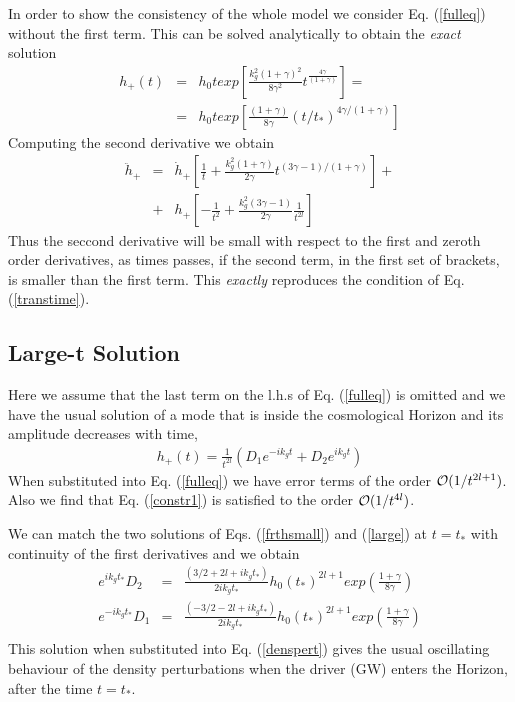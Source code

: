 \documentclass[prd,twocolumn,showpacs,preprintnumbers,amsmath,amssy mb]{revtex4}
\newcommand{\bea}{\begin{eqnarray}}
\newcommand{\eea}{\end{eqnarray}}
\newcommand{\nn}{\nonumber}
\begin{document}
In order to show the consistency of the whole model we consider 
Eq. (\ref{fulleq}) without the first term. This can be solved analytically 
to obtain the {\it exact} solution 
\bea 
\label{frthsmall}
h_{+}(t)&=&h_{0}texp
\left[\frac{k_{g}^{2}(1+\gamma )^{2}}{8\gamma ^{2}}t^{\frac{4\gamma }{(1+\gamma )}}\right]
=\nn \\&=&h_{0}texp
\left[\frac{(1+\gamma )}{8\gamma }(t/t_{*})^{4\gamma /(1+\gamma )}\right]
\eea
Computing the second derivative we obtain 
\bea 
\label{doublder}
\ddot{h}_{+}&=&\dot{h}_{+}
\left[\frac{1}{t}+\frac{k_{g}^{2}(1+\gamma )}{2\gamma }t^{(3\gamma -1)/(1+\gamma )}\right]
+\nn \\&+&h_{+}
\left[-\frac{1}{t^{2}}+\frac{k_{g}^{2}(3\gamma -1)}{2\gamma }\frac{1}{t^{2l}}\right]
\eea
Thus the seccond derivative will be small with respect to the first 
and zeroth order derivatives, as times passes, if the second term, in the 
first set of brackets, is smaller than the first term. This {\it exactly} 
reproduces the condition of Eq. (\ref{transtime}).



\subsection{Large-t Solution}

Here we assume that the last term on the l.h.s of 
Eq. (\ref{fulleq}) is omitted and we have the usual 
solution of a mode that is inside the cosmological Horizon 
and its amplitude decreases with time,
\bea 
\label{large}
h_{+}(t)=\frac{1}{t^{2l}}
\left(D_{1}e^{-ik_{g}t}+D_{2}e^{ik_{g}t}\right)
\eea
When substituted into Eq. (\ref{fulleq}) we have error terms 
of the order ${\cal O}(1/t^{2l+1})$. Also we find that 
Eq. (\ref{constr1}) is satisfied to the order 
${\cal O}(1/t^{4l})$.

We can match the two solutions of 
Eqs. (\ref{frthsmall}) and (\ref{large}) at $t=t_{*}$ 
with continuity of the first derivatives and we obtain
\bea 
\label{match}
e^{ik_{g}t_{*}}D_{2}&=&
\frac{(3/2+2l+ik_{g}t_{*})}{2ik_{g}t_{*}}h_{0}
(t_{*})^{2l+1}exp\left(\frac{1+\gamma }{8\gamma }\right)\nn \\
e^{-ik_{g}t_{*}}D_{1}&=&
\frac{(-3/2-2l+ik_{g}t_{*})}{2ik_{g}t_{*}}h_{0}
(t_{*})^{2l+1}exp\left(\frac{1+\gamma }{8\gamma }\right)
\nn \\
\eea
This solution when substituted into Eq. (\ref{denspert}) 
gives the usual oscillating behaviour of the density 
perturbations when the driver (GW) enters the Horizon, 
after the time $t=t_{*}$. 
\end{document}
